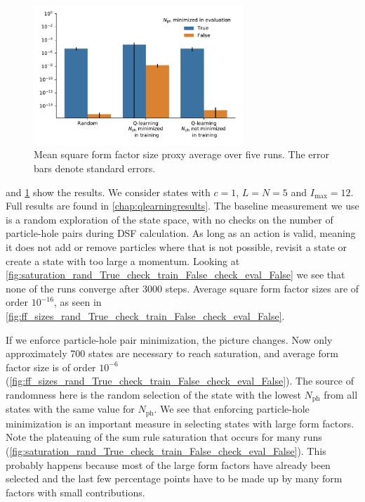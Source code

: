 \documentclass[11pt, a4paper]{report} %
\begin{document}
\begin{figure}[tb!]
  \centering
  \includegraphics[width=0.7\textwidth]{ffsizesproxy.pdf}
  \caption{Mean square form factor size proxy average over five runs. The error bars denote standard errors.}
  \label{fig:ffsizeproxy}
\end{figure}


 and \cref{fig:ffsizeproxy} show the results.
We consider states with \(c=1\), \(L=N=5\) and \(I_{\max}=12\).
Full results are found in \cref{chap:qlearningresults}.
The baseline measurement we use is a random exploration of the state space, with no checks on the number of particle-hole pairs during DSF calculation.
As long as an action is valid, meaning it does not add or remove particles where that is not possible, revisit a state or create a state with too large a momentum.
Looking at \cref{fig:saturation_rand_True_check_train_False_check_eval_False} we see that none of the runs converge after 3000 steps.
Average square form factor sizes are of order \(10^{-16}\), as seen in \cref{fig:ff_sizes_rand_True_check_train_False_check_eval_False}.



If we enforce particle-hole pair minimization, the picture changes.
Now only approximately 700 states are necessary to reach saturation, and average form factor size is of order \(10^{-6}\) (\cref{fig:ff_sizes_rand_True_check_train_False_check_eval_False}).
The source of randomness here is the random selection of the state with the lowest \(N_{\mathrm{ph}}\) from all states with the same value for \(N_{\mathrm{ph}}\).
We see that enforcing particle-hole minimization is an important measure in selecting states with large form factors.
Note the plateauing of the sum rule saturation that occurs for many runs (\cref{fig:saturation_rand_True_check_train_False_check_eval_False}). 
This probably happens because most of the large form factors have already been selected and the last few percentage points have to be made up by many form factors with small contributions.
\end{document}
